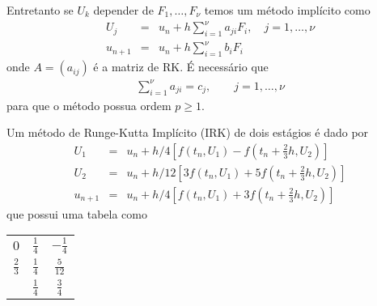 Entretanto se $U_k$ depender de $F_1,\ldots ,F_\nu $ temos um método implícito como
\begin{eqnarray}\label{IRK}
  U_j &=&u_n  + h \sum_{i=1}^\nu  a_{ji} F_i, \quad  j=1,\ldots ,\nu \\
  u_{n+1}&=&u_n  + h \sum_{i=1}^{\nu } b_i F_i
\end{eqnarray}
onde $A=(a_{ij})$ é a matriz de RK. É necessário que
\begin{eqnarray}
 \sum_{i=1}^{\nu } a_{ji} = c_j, \quad \quad  j=1,\ldots ,\nu
\end{eqnarray}
para que o método possua ordem $p\geq 1$.


\begin{ex}
Um método de Runge-Kutta Implícito (IRK) de dois estágios é dado por
\begin{eqnarray}
  U_1 &=&u_n  + h/4  [ f(t_n,U_1) - f(t_n+\frac{2}{3}h,U_2)]\\
  U_2 &=&u_n  + h/12 [3f(t_n,U_1) +5f(t_n+\frac{2}{3}h,U_2)]\\
  u_{n+1}&=&u_n  + h/4 [f(t_n,U_1) +3f(t_n+\frac{2}{3}h,U_2)]
\end{eqnarray}
que possui uma tabela como
\begin{center}
\begin{tabular}{c|cc}
  $0$ & $\frac{1}{4}$ &$-\frac{1}{4}$  \\
  $\frac{2}{3}$ & $\frac{1}{4}$ &$\frac{5}{12}$  \\  \hline
      & $\frac{1}{4}$ &$\frac{3}{4}$
\end{tabular}
\end{center}
\end{ex}


